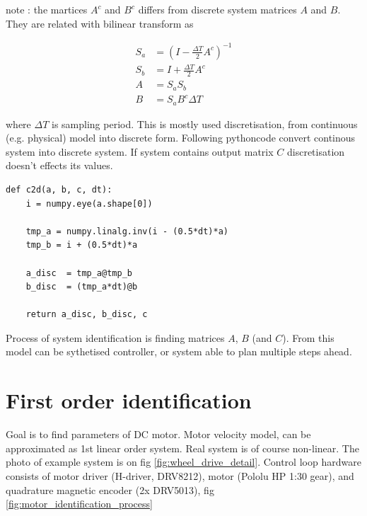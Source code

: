 \documentclass[12pt,twoside,onecolumn,openany,extrafontsizes,dvipsnames]{memoir}
\begin{document}
        note : the martices $A^c$ and $B^c$ differs from discrete system matrices $A$ and $B$.
        They are related with bilinear transform as 
        
        \begin{align}
            S_a &= (I - \frac{\Delta T}{2}A^c)^{-1} \\
            S_b &= I + \frac{\Delta T}{2}A^c \\
            A &=  S_aS_b \\
            B &= S_a B^c \Delta T 
        \end{align}

        where $\Delta T$ is sampling period. This is mostly used discretisation, 
        from continuous (e.g. physical) model into discrete form.
        Following pythoncode convert continous system into discrete system. 
        If system contains output matrix $C$ discretisation doesn't effects its values.
       
        \begin{lstlisting}[style=python_style]
def c2d(a, b, c, dt):
    i = numpy.eye(a.shape[0])
    
    tmp_a = numpy.linalg.inv(i - (0.5*dt)*a)
    tmp_b = i + (0.5*dt)*a

    a_disc  = tmp_a@tmp_b
    b_disc  = (tmp_a*dt)@b

    return a_disc, b_disc, c
        \end{lstlisting}
       
        Process of system identification is finding matrices $A$, $B$ (and $C$). From this model 
        can be sythetised controller, or system able to plan multiple steps ahead.

    \section{First order identification}   
        Goal is to find parameters of DC motor. Motor velocity model, can be approximated as 1st linear order system. 
        Real system is of course non-linear. The photo of example system is on fig \ref{fig:wheel_drive_detail}.
        Control loop hardware consists of motor driver (H-driver, DRV8212), motor (Pololu HP 1:30 gear), and quadrature magnetic encoder (2x DRV5013),
        fig \ref{fig:motor_identification_process}
\end{document}
